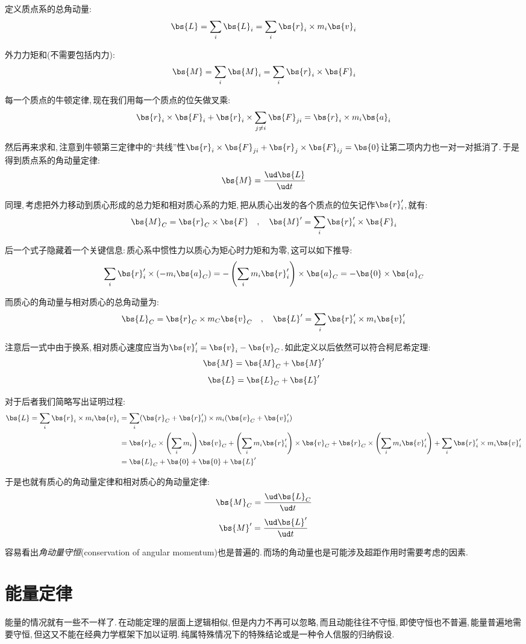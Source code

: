 定义质点系的总角动量:
\[\bs{L}=\sum_i\bs{L}_i=\sum_i\bs{r}_i\times m_i\bs{v}_i\]

外力力矩和(不需要包括内力):
\[\bs{M}=\sum_i\bs{M}_i=\sum_i \bs{r}_i\times\bs{F}_i\]

每一个质点的牛顿定律,\,现在我们用每一个质点的位矢做叉乘:
\[\bs{r}_i\times\bs{F}_i+\bs{r}_i\times\sum_{j\neq i}\bs{F}_{ji}=\bs{r}_i\times m_i\bs{a}_i\]

然后再来求和,\,注意到牛顿第三定律中的``共线''性$\bs{r}_i\times \bs{F}_{ji}+\bs{r}_j\times \bs{F}_{ij}=\bs{0}$让第二项内力也一对一对抵消了.\,于是得到质点系的角动量定律:
\[\bs{M}=\frac{\ud \bs{L}}{\ud t}\]

\vspace{0.5cm}

同理,\,考虑把外力移动到质心形成的总力矩和相对质心系的力矩,\,把从质心出发的各个质点的位矢记作$\bs{r}_i'$,\,就有:
\[\bs{M}_C=\bs{r}_C\times \bs{F}\quad,\quad \bs{M}'=\sum_i \bs{r}_i'\times \bs{F}_i\]

后一个式子隐藏着一个关键信息:\,质心系中惯性力以质心为矩心时力矩和为零,\,这可以如下推导:
\[\sum_i \bs{r}_i'\times (-m_i \bs{a}_C)=-\left(\sum_i m_i \bs{r}_i'\right)\times \bs{a}_C=-\bs{0}\times \bs{a}_C\]

而质心的角动量与相对质心的总角动量为:
\[\bs{L}_C=\bs{r}_C\times m_C\bs{v}_C\quad,\quad \bs{L}'=\sum_i \bs{r}_i'\times m_i\bs{v}_i'\]

注意后一式中由于换系,\,相对质心速度应当为$\bs{v}_i'=\bs{v}_i-\bs{v}_C$.\,如此定义以后依然可以符合柯尼希定理:
\[\bs{M}=\bs{M}_C+\bs{M}'\]
\[\bs{L}=\bs{L}_C+\bs{L}'\]

对于后者我们简略写出证明过程:
\begin{align*}
	\bs{L}=\sum_i\bs{r}_i\times m_i\bs{v}_i &=\sum_i(\bs{r}_C+\bs{r}_i')\times m_i(\bs{v}_C+\bs{v}_i')\\
					 &=\bs{r}_C\times\left(\sum_i m_i\right)\bs{v}_C+\left(\sum_i m_i\bs{r}_i'\right)\times\bs{v}_C+\bs{r}_C\times\left(\sum_i m_i\bs{v}_i'\right)+\sum_i \bs{r}_i'\times m_i\bs{v}_i'\\
					 &=\bs{L}_C+\bs{0}+\bs{0}+\bs{L}'
\end{align*}

于是也就有质心的角动量定律和相对质心的角动量定律:
\[\bs{M}_C=\frac{\ud \bs{L}_C}{\ud t}\]
\[\bs{M}'=\frac{\ud \bs{L}'}{\ud t}\]

容易看出\emph{角动量守恒}(conservation of angular momentum)也是普遍的.\,而场的角动量也是可能涉及超距作用时需要考虑的因素.

\section{能量定律}
能量的情况就有一些不一样了.\,在动能定理的层面上逻辑相似,\,但是内力不再可以忽略,\,而且动能往往不守恒,\,即使守恒也不普遍,\,能量普遍地需要守恒,\,但这又不能在经典力学框架下加以证明.\,纯属特殊情况下的特殊结论或是一种令人信服的归纳假设.

